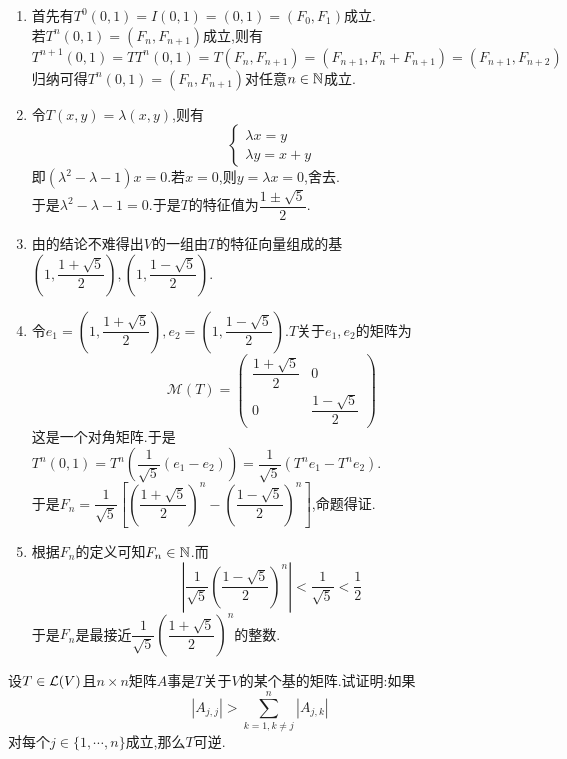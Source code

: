 \documentclass{ctexart}
\begin{document}
\begin{solution}
    \begin{enumerate}[label=\tbf{(\arabic*)}]
        \item 首先有$T^0(0,1)=I(0,1)=(0,1)=(F_0,F_1)$成立.\\
            若$T^{n}(0,1)=(F_n,F_{n+1})$成立,则有
            \[T^{n+1}(0,1)=TT^n(0,1)=T(F_n,F_{n+1})=(F_{n+1},F_n+F_{n+1})=(F_{n+1},F_{n+2})\]
            归纳可得$T^{n}(0,1)=(F_n,F_{n+1})$对任意$n\in\mathbb{N}$成立.
        \item 令$T(x,y)=\lambda(x,y)$,则有
            \[\left\{\begin{array}{l}
                \lambda x=y\\
                \lambda y=x+y
            \end{array}\right.\]
            即$(\lambda^2-\lambda-1)x=0$.若$x=0$,则$y=\lambda x=0$,舍去.\\
            于是$\lambda^2-\lambda-1=0$.于是$T$的特征值为$\dfrac{1\pm\sqrt5}{2}$.
        \item 由的结论不难得出$V$的一组由$T$的特征向量组成的基$\left(1,\dfrac{1+\sqrt5}{2}\right),\left(1,\dfrac{1-\sqrt5}{2}\right)$.
        \item 令$e_1=\left(1,\dfrac{1+\sqrt5}{2}\right),e_2=\left(1,\dfrac{1-\sqrt5}{2}\right)$.$T$关于$e_1,e_2$的矩阵为
            \[\mathcal{M}(T)=\begin{pmatrix}
                \dfrac{1+\sqrt5}{2}&0\\0&\dfrac{1-\sqrt5}{2}
            \end{pmatrix}\]
            这是一个对角矩阵.于是$T^{n}(0,1)=T^{n}\left(\dfrac{1}{\sqrt5}(e_1-e_2)\right)=\dfrac{1}{\sqrt5}\left(T^ne_1-T^ne_2\right)$.\\
            于是$F_n=\dfrac{1}{\sqrt{5}}\left[\left(\dfrac{1+\sqrt5}{2}\right)^n-\left(\dfrac{1-\sqrt5}{2}\right)^n\right]$,命题得证.
        \item 根据$F_n$的定义可知$F_n\in\mathbb{N}$.而
            \[\left|\dfrac{1}{\sqrt5}\left(\dfrac{1-\sqrt5}{2}\right)^n\right|<\dfrac{1}{\sqrt5}<\dfrac12\]
            于是$F_n$是最接近$\dfrac{1}{\sqrt5}\left(\dfrac{1+\sqrt5}{2}\right)^n$的整数.
    \end{enumerate}
\end{solution}
\begin{problem}[22.]
   设$T\in\mathcal{L}(V)$且$n\times n$矩阵$A$事是$T$关于$V$的某个基的矩阵.试证明:如果
   \[\left|A_{j,j}\right|>\sum_{k=1,k\neq j}^n\left|A_{j,k}\right|\]
   对每个$j\in\{1,\cdots,n\}$成立,那么$T$可逆.
\end{problem}
\end{document}
